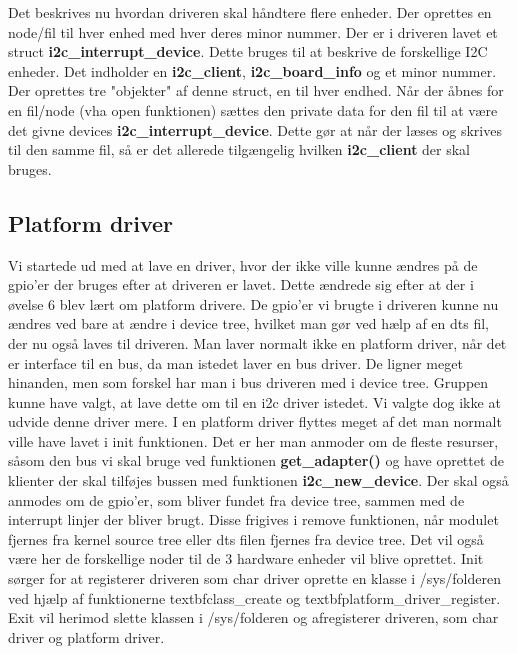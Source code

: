 \documentclass[Softwaredesign/Softwaredesign_main.tex]{subfiles}
\begin{document}
Det beskrives nu hvordan driveren skal håndtere flere enheder. Der oprettes en node/fil til hver enhed med hver deres minor nummer.
Der er i driveren lavet et struct \textbf{i2c\_interrupt\_device}. Dette bruges til at beskrive de forskellige I2C enheder. Det indholder en \textbf{i2c\_client}, \textbf{i2c\_board\_info} og et minor nummer. Der oprettes tre "objekter" af denne struct, en til hver endhed. Når der åbnes for en fil/node (vha open funktionen) sættes den private data for den fil til at være det givne devices \textbf{i2c\_interrupt\_device}. Dette gør at når der læses og skrives til den samme fil, så er det allerede tilgængelig hvilken \textbf{i2c\_client} der skal bruges.

\subsection{Platform driver}
Vi startede ud med at lave en driver, hvor der ikke ville kunne ændres på de gpio'er der bruges efter at driveren er lavet. Dette ændrede sig efter at der i øvelse 6 blev lært om platform drivere. De gpio'er vi brugte i driveren kunne nu ændres ved bare at ændre i device tree, hvilket man gør ved hælp af en dts fil, der nu også laves til driveren. Man laver normalt ikke en platform driver, når det er interface til en bus, da man istedet laver en bus driver. De ligner meget hinanden,  men som forskel har man i bus driveren med i device tree. Gruppen kunne have valgt, at lave dette om til en i2c driver istedet. Vi valgte dog ikke at udvide denne driver mere. I en platform driver flyttes meget af det man normalt ville have lavet i init funktionen. Det er her man anmoder om de fleste resurser, såsom den bus vi skal bruge ved funktionen \textbf{get\_adapter()} og have oprettet de klienter der skal tilføjes bussen med funktionen \textbf{i2c\_new\_device}. Der skal også anmodes om de gpio'er, som bliver fundet fra device tree, sammen med de interrupt linjer der bliver brugt. Disse frigives i remove funktionen, når modulet fjernes fra kernel source tree eller dts filen fjernes fra device tree. Det vil også være her de forskellige noder til de 3 hardware enheder vil blive oprettet.
Init sørger for at registerer driveren som char driver oprette en klasse i /sys/folderen ved hjælp af funktionerne textbf{class\_create} og textbf{platform\_driver\_register}. Exit vil herimod slette klassen i /sys/folderen og afregisterer driveren, som char driver og platform driver.
\end{document}
